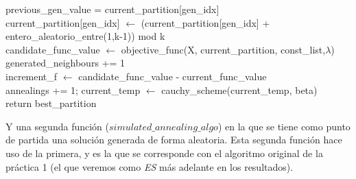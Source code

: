 \documentclass[11pt,a4paper]{article}
\begin{document}
\begin{algorithm}[H]
{{{                    
                    previous\_gen\_value = current\_partition[gen\_idx] \\
                    current\_partition[gen\_idx] $\leftarrow$ (current\_partition[gen\_idx] + entero\_aleatorio\_entre(1,k-1)) mod k \\
                    candidate\_func\_value $\leftarrow$ objective\_func(X, current\_partition, const\_list,$\lambda$) \\
                    generated\_neighbours += 1\\
                    increment\_f $\leftarrow$ candidate\_func\_value - current\_func\_value \\
                }
                annealings += 1; 
                current\_temp $\leftarrow$ cauchy\_scheme(current\_temp, beta) \\
            }
	 		return best\_partition \\
	 	}
	\end{algorithm}
	Y una segunda función ($simulated\_annealing\_algo$) en la que se tiene como punto de partida una solución generada de forma aleatoria. Esta segunda función hace uso de la primera, y es la que se corresponde con el algoritmo original de la práctica 1 (el que veremos como \textit{ES} más adelante en los resultados). 
\end{document}
